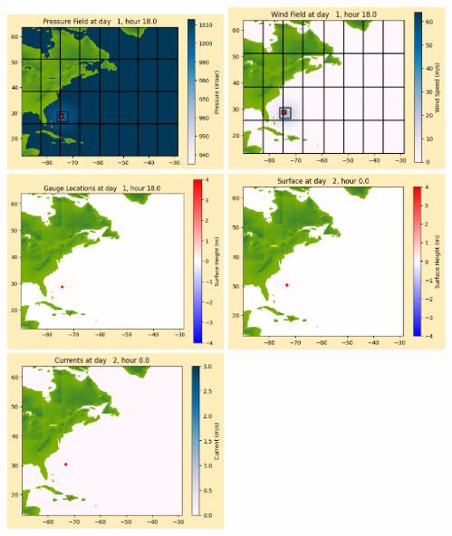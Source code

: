 \documentclass[11pt]{article}
\begin{document}
\includegraphics[width=0.475\textwidth]{frame0019fig1012.png}
\vskip 10pt 
\includegraphics[width=0.475\textwidth]{frame0019fig1013.png}
\includegraphics[width=0.475\textwidth]{frame0019fig1014.png}
\vskip 10pt 
\includegraphics[width=0.475\textwidth]{frame0020fig1001.png}
\includegraphics[width=0.475\textwidth]{frame0020fig1002.png}
\end{document}
